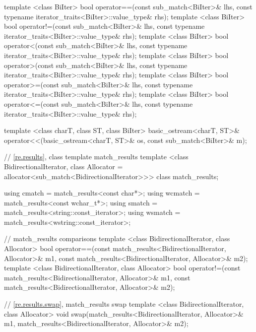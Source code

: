 \begin{codeblock}
{  template <class BiIter>
    bool operator==(const sub_match<BiIter>& lhs,
                    const typename iterator_traits<BiIter>::value_type& rhs);
  template <class BiIter>
    bool operator!=(const sub_match<BiIter>& lhs,
                    const typename iterator_traits<BiIter>::value_type& rhs);
  template <class BiIter>
    bool operator<(const sub_match<BiIter>& lhs,
                   const typename iterator_traits<BiIter>::value_type& rhs);
  template <class BiIter>
    bool operator>(const sub_match<BiIter>& lhs,
                   const typename iterator_traits<BiIter>::value_type& rhs);
  template <class BiIter>
    bool operator>=(const sub_match<BiIter>& lhs,
                    const typename iterator_traits<BiIter>::value_type& rhs);
  template <class BiIter>
    bool operator<=(const sub_match<BiIter>& lhs,
                    const typename iterator_traits<BiIter>::value_type& rhs);

  template <class charT, class ST, class BiIter>
    basic_ostream<charT, ST>&
    operator<<(basic_ostream<charT, ST>& os, const sub_match<BiIter>& m);

  // \ref{re.results}, class template match_results
  template <class BidirectionalIterator,
            class Allocator = allocator<sub_match<BidirectionalIterator>>>
    class match_results;

  using cmatch  = match_results<const char*>;
  using wcmatch = match_results<const wchar_t*>;
  using smatch  = match_results<string::const_iterator>;
  using wsmatch = match_results<wstring::const_iterator>;

  // match_results comparisons
  template <class BidirectionalIterator, class Allocator>
    bool operator==(const match_results<BidirectionalIterator, Allocator>& m1,
                    const match_results<BidirectionalIterator, Allocator>& m2);
  template <class BidirectionalIterator, class Allocator>
    bool operator!=(const match_results<BidirectionalIterator, Allocator>& m1,
                    const match_results<BidirectionalIterator, Allocator>& m2);

  // \ref{re.results.swap}, match_results swap
  template <class BidirectionalIterator, class Allocator>
    void swap(match_results<BidirectionalIterator, Allocator>& m1,
              match_results<BidirectionalIterator, Allocator>& m2);

}
\end{codeblock}
